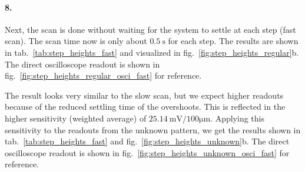 \documentclass[a4paper,twoside,11pt,DIV=13,BCOR=5mm,numbers=noenddot]{scrbook}
\begin{document}


\paragraph*{8.}

Next, the scan is done without waiting for the system to settle at each step (fast scan). The scan time now is only about $\qty{0.5}{\s}$ for each step.
The results are shown in tab.~\ref{tab:step_heights_fast} and visualized in fig.~\ref{fig:step_heights_regular}b.
The direct oscilloscope readout is shown in fig.~\ref{fig:step_heights_regular_osci_fast} for reference.


The result looks very similar to the slow scan, but we expect higher readouts because of the reduced settling time of the overshoots. This is reflected in the higher sensitivity (weighted average) of
$\qty{25.14}{\milli\V\per100\micro\m}$. Applying this sensitivity to the readouts from the unknown pattern, we get the results shown in tab.~\ref{tab:step_heights_fast} and fig.~\ref{fig:step_heights_unknown}b.
The direct oscilloscope readout is shown in fig.~\ref{fig:step_heights_unknown_osci_fast} for reference.
\end{document}
